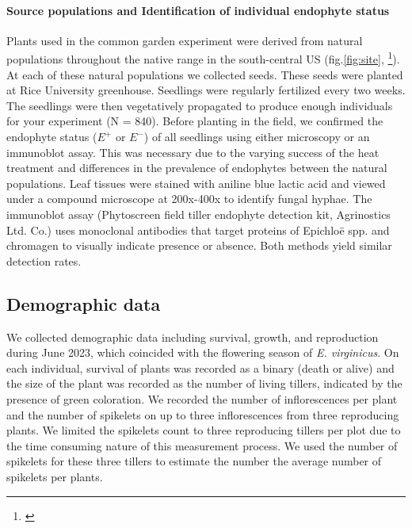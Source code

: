 \documentclass[11pt]{article}
\newcommand{\jacob}[2]{{\color{blue}{#1}}\footnote{\textit{\color{blue}{#2}}}}
\begin{document}
\paragraph {Source populations and Identification of individual endophyte status} 
Plants used  in the common garden experiment were derived from natural populations throughout the native range in the south-central US (fig.\ref{fig:site}, \jacob{Table X}{We need this table  in the Appendix}). 
At each of these natural populations we collected seeds. 
These seeds were planted at Rice University greenhouse.
Seedlings were regularly fertilized every two weeks. 
The seedlings were then vegetatively propagated to produce enough individuals for your experiment (N = 840).
Before planting in the field, we confirmed the endophyte status ($E^+$ or $E^-$) of all  seedlings using either microscopy or an immunoblot assay. 
This was necessary due to the varying success of the heat treatment and differences in the prevalence of endophytes between the natural populations. 
Leaf tissues were stained with aniline blue lactic acid and viewed under a compound microscope at 200x-400x to identify fungal hyphae. 
The immunoblot assay (Phytoscreen field tiller endophyte detection kit, Agrinostics Ltd. Co.) uses monoclonal antibodies that target proteins of Epichloë spp. and chromagen to visually indicate presence or absence. Both methods yield similar detection rates.  


\subsection*{Demographic data}
We collected demographic data including survival, growth, and reproduction during June 2023, which coincided with the flowering season of \emph{E. virginicus}. 
On each individual, survival of plants was recorded as a binary (death or alive) and the size of the plant was recorded as the number of living tillers, indicated by the presence of green coloration. 
We recorded the number of inflorescences per plant and the number of spikelets on up to three inflorescences from three reproducing plants.
We limited the spikelets count to three reproducing tillers per plot due to the time consuming nature of this measurement process. 
We used the number of spikelets for these three tillers to estimate the number the average number of spikelets per plants.
\end{document}
